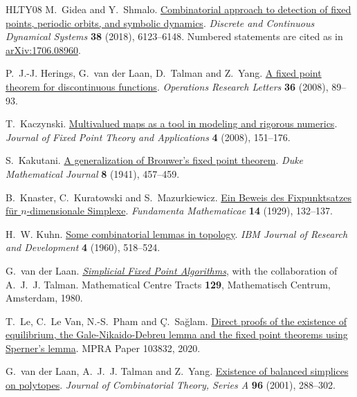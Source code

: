 \documentclass[11pt]{amsart}
\theoremstyle{definition}
\theoremstyle{remark}
\numberwithin{equation}{section}
\begin{document}
\begin{thebibliography}{HLTY08}
M.~Gidea and Y.~Shmalo.
\href{https://doi.org/10.3934/dcds.2018264}{Combinatorial approach to detection of fixed points, periodic orbits, and symbolic dynamics}.
\emph{Discrete and Continuous Dynamical Systems} \textbf{38} (2018), 6123--6148. Numbered statements are cited as in \href{https://arxiv.org/abs/1706.08960}{arXiv:1706.08960}.

P.~J.-J. Herings, G.~van der Laan, D.~Talman and Z.~Yang.
\href{https://doi.org/10.1016/j.orl.2007.03.008}{A fixed point theorem for discontinuous functions}.
\emph{Operations Research Letters} \textbf{36} (2008), 89--93.

T.~Kaczynski.
\href{https://doi.org/10.1007/s11784-008-0089-y}{Multivalued maps as a tool in modeling and rigorous numerics}.
\emph{Journal of Fixed Point Theory and Applications} \textbf{4} (2008), 151--176.

S.~Kakutani.
\href{https://doi.org/10.1215/S0012-7094-41-00838-4}{A generalization of Brouwer's fixed point theorem}.
\emph{Duke Mathematical Journal} \textbf{8} (1941), 457--459.

B.~Knaster, C.~Kuratowski and S.~Mazurkiewicz.
\href{https://doi.org/10.4064/fm-14-1-132-137}{Ein Beweis des Fixpunktsatzes f\"ur $n$-dimensionale Simplexe}.
\emph{Fundamenta Mathematicae} \textbf{14} (1929), 132--137.

H.~W. Kuhn.
\href{https://doi.org/10.1147/rd.45.0518}{Some combinatorial lemmas in topology}.
\emph{IBM Journal of Research and Development} \textbf{4} (1960), 518--524.

G.~van der Laan.
\href{https://ir.cwi.nl/pub/12988}{\emph{Simplicial Fixed Point Algorithms}}, with the collaboration of A.~J.~J. Talman.
Mathematical Centre Tracts \textbf{129}, Mathematisch Centrum, Amsterdam, 1980.

T.~Le, C.~Le Van, N.-S.~Pham and \c{C}.~Sa\u{g}lam.
\href{https://mpra.ub.uni-muenchen.de/103832/}{Direct proofs of the existence of equilibrium, the Gale-Nikaido-Debreu lemma and the fixed point theorems using Sperner's lemma}.
MPRA Paper 103832, 2020.

G.~van der Laan, A.~J.~J. Talman and Z.~Yang.
\href{https://doi.org/10.1006/jcta.2001.3178}{Existence of balanced simplices on polytopes}.
\emph{Journal of Combinatorial Theory, Series A} \textbf{96} (2001), 288--302.


\end{thebibliography}
\end{document}
